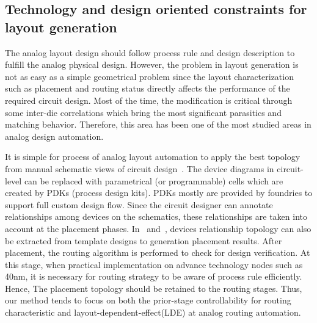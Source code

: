     \subsection{Technology and design oriented constraints for layout generation}\label{subsec:HCDROverview}

      The analog layout design should follow process rule and design description to fulfill the analog physical design. However, the problem in layout generation is not as easy as a simple geometrical problem since the layout characterization such as placement and routing status directly affects the performance of the required circuit design. Most of the time, the modification is critical through some inter-die correlations which bring the most significant parasitics and matching behavior. Therefore, this area has been one of the most studied areas in analog design automation. 

      It is simple for process of analog layout automation to apply the best topology from manual schematic views of circuit design~\cite{ALE-iscas1990}. The device diagrams in circuit-level can be replaced with parametrical (or programmable) cells which are created by PDKs (process design kits). PDKs mostly are provided by foundries to support full custom design flow. Since the circuit designer can annotate relationships among devices on the schematics, these relationships are taken into account at the placement phases. In~\cite{apnsi-pohung-dac07,mscgrlal-tcad2006Jun} and~\cite{palpndg-iccad2011}, devices relationship topology can also be extracted from template designs to generation placement results. After placement, the routing algorithm is performed to check for design verification. At this stage, when practical implementation on advance technology nodes such as 40nm, it is necessary for routing strategy to be aware of process rule efficiently. Hence, The placement topology should be retained to the routing stages. Thus, our method tends to focus on both the prior-stage controllability for routing characteristic and layout-dependent-effect(LDE) at analog routing automation. 
